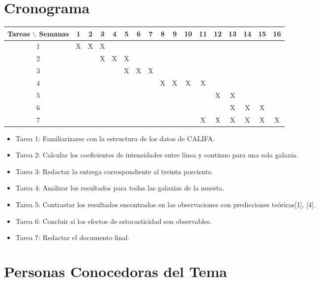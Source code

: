 \documentclass[12pt]{article}
\begin{document}
\section{Cronograma}

\begin{table}[htb]
	\begin{tabular}{|c|cccccccccccccccc| }
	\hline
	Tareas $\backslash$ Semanas & 1 & 2 & 3 & 4 & 5 & 6 & 7 & 8 & 9 & 10 & 11 & 12 & 13 & 14 & 15 & 16  \\
	\hline
	1 & X & X & X &   &   &   &   &   &   &   &   &   &   &   &   &   \\
	2 &   &   & X & X & X &   &   &   &   &   &   &   &   &   &   &   \\
	3 &   &   &   &   & X & X & X &   &   &   &   &   &   &   &   &   \\
	4 &   &   &   &   &   &   &   & X & X & X & X &   &   &   &   &   \\
	5 &   &   &   &   &   &   &   &   &   &   &   & X & X &   &   &   \\
	6 &   &   &   &   &   &   &   &   &   &   &   &   & X & X & X &   \\
	7 &   &   &   &   &   &   &   &   &   &   & X & X & X & X & X & X \\
	\hline
	\end{tabular}
\end{table}
\vspace{1mm}

\begin{itemize}
    \item Tarea 1: Familiarizarse con la estructura de los datos de
      CALIFA.
    \item Tarea 2: Calcular los coeficientes de intensidades entre
      l\'inea y continuo para una sola galaxia.
    \item Tarea 3: Redactar la entrega correspondiente al treinta
      porciento
    \item Tarea 4: Analizar los resultados para todas las galaxias de
      la muesta.
    \item Tarea 5: Contrastar los resultados encontrados en las
      observaciones con predicciones te\'oricas[1], [4].
    \item Tarea 6: Concluir si los efectos de estocasticidad son observables.
    \item Tarea 7: Redactar el documento final.
\end{itemize}

\section{Personas Conocedoras del Tema}
\end{document}
